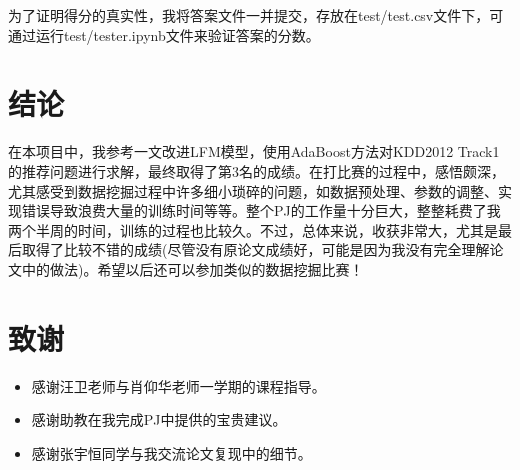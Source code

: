 \documentclass[12pt]{article} %
\begin{document}
\begin{sloppypar}
为了证明得分的真实性，我将答案文件一并提交，存放在test/test.csv文件下，可通过运行test/tester.ipynb文件来验证答案的分数。

\section{结论}

在本项目中，我参考\cite{chen2012context}一文改进LFM模型，使用AdaBoost方法对KDD2012 Track1的推荐问题进行求解，最终取得了第3名的成绩。在打比赛的过程中，感悟颇深，尤其感受到数据挖掘过程中许多细小琐碎的问题，如数据预处理、参数的调整、实现错误导致浪费大量的训练时间等等。整个PJ的工作量十分巨大，整整耗费了我两个半周的时间，训练的过程也比较久。不过，总体来说，收获非常大，尤其是最后取得了比较不错的成绩(尽管没有原论文成绩好，可能是因为我没有完全理解论文中的做法)。希望以后还可以参加类似的数据挖掘比赛！




\newpage
 


\section*{致谢}


\begin{itemize}
\item 感谢汪卫老师与肖仰华老师一学期的课程指导。
\item 感谢助教在我完成PJ中提供的宝贵建议。
\item 感谢张宇恒同学与我交流论文复现中的细节。
\end{itemize}




\end{sloppypar}
\end{document}
